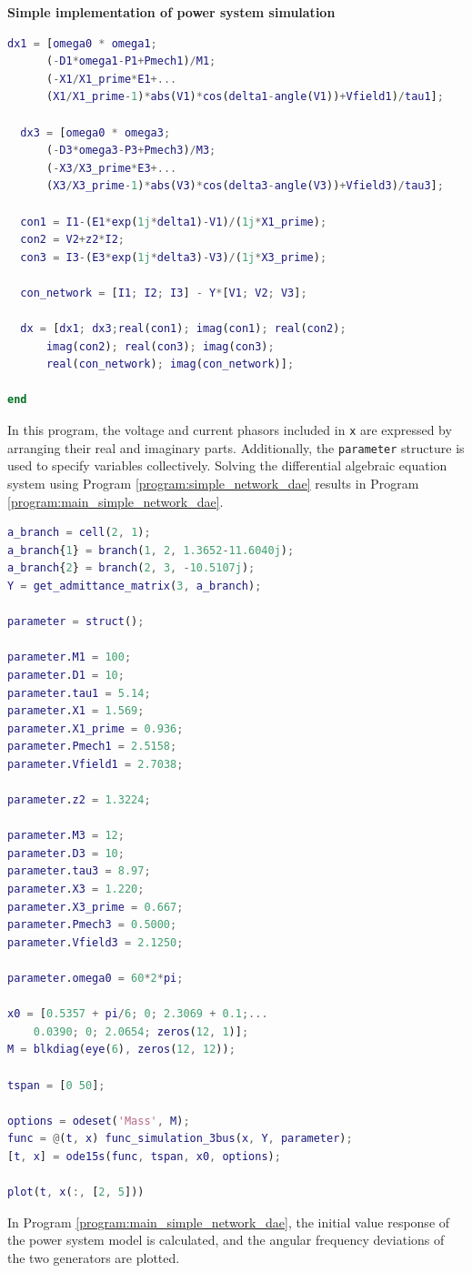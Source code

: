 \documentclass[graybox, envcountchap]{svmult}
\begin{document}
\begin{example}{\textbf{Simple implementation of power system
simulation}\label{ex:dae_ex2}}
\begin{lstlisting}[language=Matlab, caption=func\_simulation\_3bus.m, label={program:simple_network_dae}]
  dx1 = [omega0 * omega1;
      (-D1*omega1-P1+Pmech1)/M1;
      (-X1/X1_prime*E1+...
      (X1/X1_prime-1)*abs(V1)*cos(delta1-angle(V1))+Vfield1)/tau1];

  dx3 = [omega0 * omega3;
      (-D3*omega3-P3+Pmech3)/M3;
      (-X3/X3_prime*E3+...
      (X3/X3_prime-1)*abs(V3)*cos(delta3-angle(V3))+Vfield3)/tau3];

  con1 = I1-(E1*exp(1j*delta1)-V1)/(1j*X1_prime);
  con2 = V2+z2*I2;
  con3 = I3-(E3*exp(1j*delta3)-V3)/(1j*X3_prime);

  con_network = [I1; I2; I3] - Y*[V1; V2; V3];

  dx = [dx1; dx3;real(con1); imag(con1); real(con2);
      imag(con2); real(con3); imag(con3);
      real(con_network); imag(con_network)];

end
\end{lstlisting}

In this program, the voltage and current phasors included in \verb|x| are
expressed by arranging their real and imaginary parts. Additionally, the
\verb|parameter| structure is used to specify variables collectively. Solving
the differential algebraic equation system using Program
\ref{program:simple_network_dae} results in Program
\ref{program:main_simple_network_dae}.

\begin{lstlisting}[language=Matlab, caption=main\_simulation\_simple.m, label={program:main_simple_network_dae}]
a_branch = cell(2, 1);
a_branch{1} = branch(1, 2, 1.3652-11.6040j);
a_branch{2} = branch(2, 3, -10.5107j);
Y = get_admittance_matrix(3, a_branch);

parameter = struct();

parameter.M1 = 100;
parameter.D1 = 10;
parameter.tau1 = 5.14;
parameter.X1 = 1.569;
parameter.X1_prime = 0.936;
parameter.Pmech1 = 2.5158;
parameter.Vfield1 = 2.7038;

parameter.z2 = 1.3224;

parameter.M3 = 12;
parameter.D3 = 10;
parameter.tau3 = 8.97;
parameter.X3 = 1.220;
parameter.X3_prime = 0.667;
parameter.Pmech3 = 0.5000;
parameter.Vfield3 = 2.1250;

parameter.omega0 = 60*2*pi;

x0 = [0.5357 + pi/6; 0; 2.3069 + 0.1;...
    0.0390; 0; 2.0654; zeros(12, 1)];
M = blkdiag(eye(6), zeros(12, 12));

tspan = [0 50];

options = odeset('Mass', M);
func = @(t, x) func_simulation_3bus(x, Y, parameter);
[t, x] = ode15s(func, tspan, x0, options); 

plot(t, x(:, [2, 5]))
\end{lstlisting}

In Program \ref{program:main_simple_network_dae}, the initial value response of
the power system model is calculated, and the angular frequency deviations of
the two generators are plotted.
\end{example}
\end{document}
